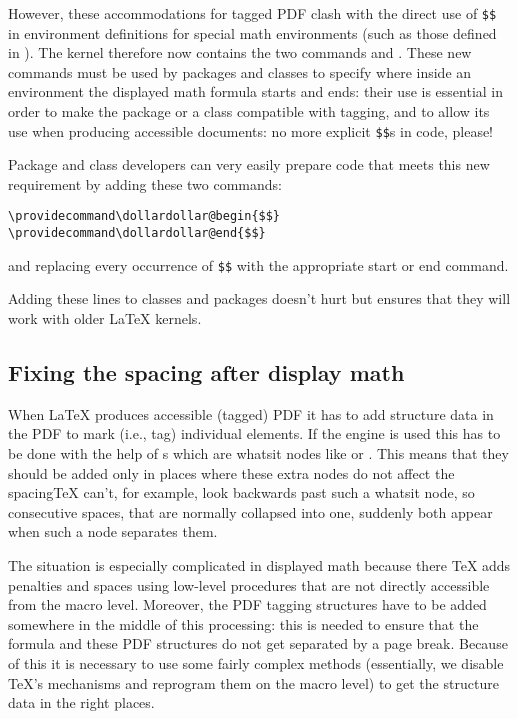 \documentclass{ltnews}
\providecommand\Dash {\unskip \textemdash}
\providecommand\pdfTeX{\hologo{pdfTeX}}
\begin{document}
However, these accommodations for tagged PDF clash with the direct use
of \verb=$$= in environment definitions for special math environments
(such as those defined in ).  The kernel therefore now
contains the two commands  and
.  These new commands must be used by packages
and classes to specify where inside an environment the displayed math
formula starts and ends: their use is essential in order to make the
package or a class compatible with tagging, and to allow its use when
producing accessible documents: no more explicit \texttt{\$\$}s in
code, please!

Package and class developers can very easily prepare code that meets
this new requirement by adding these two commands:
\begin{verbatim}
\providecommand\dollardollar@begin{$$}
\providecommand\dollardollar@end{$$}
\end{verbatim}
and replacing every occurrence of \verb=$$= with the appropriate start
or end command.

Adding these  lines to classes and packages doesn't
hurt but ensures that they will work with older \LaTeX{} kernels.



\subsection{Fixing the spacing after display math}

When \LaTeX{} produces accessible (tagged) PDF it has to add structure
data in the PDF to mark (i.e., tag) individual elements. If the
\pdfTeX{} engine is used this has to be done with the help of
s which are whatsit nodes like  or
. This means that they should be added only in places where
these extra nodes do not affect the spacing\Dash \TeX{} can't, for
example, look backwards past such a whatsit node, so consecutive
spaces, that are normally collapsed into one, suddenly both appear
when such a node separates them.

The situation is especially complicated in displayed math because
there \TeX{} adds penalties and spaces using low-level procedures that
are not directly accessible from the macro level.  Moreover, the PDF
tagging structures have to be added somewhere in the middle of this
processing: this is needed to ensure that the formula and these PDF
structures do not get separated by a page break. Because of this it is
necessary to use some fairly complex methods (essentially, we disable
\TeX's mechanisms and reprogram them on the macro level) to get the
structure data in the right places.
\end{document}
